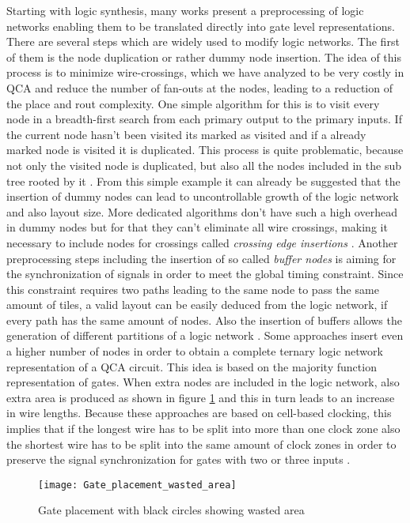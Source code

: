 Starting with logic synthesis, many works present a preprocessing of logic networks enabling them to be translated directly into gate level representations. There are several steps which are widely used to modify logic networks. The first of them is the node duplication or rather dummy node insertion. The idea of this process is to minimize wire-crossings, which we have analyzed to be very costly in QCA and reduce the number of fan-outs at the nodes, leading to a reduction of the place and rout complexity. One simple algorithm for this is to visit every node in a breadth-first search from each primary output to the primary inputs. If the current node hasn't been visited its marked as visited and if a already marked node is visited it is duplicated. This process is quite problematic, because not only the visited node is duplicated, but also all the nodes included in the sub tree rooted by it \cite{QCA-LG}. From this simple example it can already be suggested that the insertion of dummy nodes can lead to uncontrollable growth of the logic network and also layout size. More dedicated algorithms don't have such a high overhead in dummy nodes but for that they can't eliminate all wire crossings, making it necessary to include nodes for crossings called \textit{crossing edge insertions} \cite{node_duplication}. Another preprocessing steps including the insertion of so called \textit{buffer nodes} is aiming for the synchronization of signals in order to meet the global timing constraint. Since this constraint requires two paths leading to the same node to pass the same amount of tiles, a valid layout can be easily deduced from the logic network, if every path has the same amount of nodes. Also the insertion of buffers allows the generation of different partitions of a logic network \cite{dummy_and_buffer_nodes}. Some approaches insert even a higher number of nodes in order to obtain a complete ternary logic network representation of a QCA circuit. This idea is based on the majority function representation of gates. When extra nodes are included in the logic network, also extra area is produced as shown in figure \ref{fig:Gate_placement_wasted_area} and this in turn leads to an increase in wire lengths. Because these approaches are based on cell-based clocking, this implies that if the longest wire has to be split into more than one clock zone also the shortest wire has to be split into the same amount of clock zones in order to preserve the signal synchronization for gates with two or three inputs \cite{QCA-LG}.

\begin{figure}
	\centering
	\texttt{[image: Gate\_placement\_wasted\_area]}
	\caption{Gate placement with black circles showing wasted area \cite{QCA-LG}}\label{fig:Gate_placement_wasted_area}
\end{figure}

